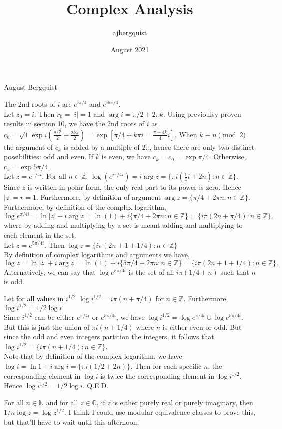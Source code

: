 \documentclass{article}
\title{Complex Analysis}
\author{ajbergquist }
\date{August 2021}
\theoremstyle{definition}
\newcommand{\Z}{\mathbb{Z}}
\newcommand{\C}{\mathbb{C}}
\newcommand{\N}{\mathbb{N}}
\newcommand{\cs}[1]{\color{blue}{#1}\normalcolor}
\begin{document}
\hfill August Bergquist

 The $2$nd roots of $i$ are $e^{i\pi/4}$ and $e^{i5\pi/4}$.\\

 Let $z_0 = i$. Then $r_0 = |i| =1$ and $\arg i = \pi/2 + 2\pi k$. Using previoulsy proven results in section 10, we have the 2nd roots of $i$ as
$c_k = \sqrt{1}\exp{i(\frac{\pi/2}{2} + \frac{2k\pi}{2}) = \exp{[\pi/4 + k\pi i= \frac{\pi + 4k}{4}i] }}$. When $k\equiv n \pmod{2}$ \cs{What is $n$?} the argument of $c_k$ is added by a multiple of $2\pi$, hence there are only two distinct possibilities: odd and even. If $k$ is even, we have $c_k = c_0 = \exp{\pi/4}$. Otherwise, $c_1 = \exp{5\pi/4}$.\\

 Let $z = e^{\pi/4i}$. For all $n\in \Z$, $\log(e^{i\pi/4i}) = i\arg{z} = \{\pi i(\frac{1}{4}i + 2n) : n\in \Z\}$. \\
 Since $z$ is written in polar form, the only real part to its power is zero. Hence $|z| = r= 1$. Furthermore, by definition of argument $\arg{z} = \{\pi/4 + 2\pi n : n\in \Z\}$. Furthermore, by definition of the complex logarithm, 
$$\log e^{\pi/4 i} =  \ln|z| + i\arg{z} = \ln(1) + i\{\pi/4 + 2\pi n: n\in \Z\} = \{i\pi(2n+\pi/4) : n\in \Z\},$$
where by adding and multiplying by a set is meant adding and multiplying to each element in the set.\\

 Let $z = e^{5\pi/4 i}$. Then $\log z = \{i\pi(2n+1+1/4) : n\in \Z\}$\\

By definition of complex logarithms and arguments we have,
$$\log z = \ln |z| + i\arg{z} = \ln(1) + i\{5\pi/4 + 2\pi n: n\in \Z\} = \{i\pi(2n + 1 + 1/4) : n\in \Z\}.$$ Alternatively, we can say that $\log{e^{5\pi/4i}}$ is the set of all $i\pi(1/4 + n)$ such that $n$ is odd. 

 Let for all values in $i^{1/2}$ $\log{i^{1/2}} = i\pi(n + \pi/4)$ for $n\in \Z$. Furthermore, $\log{i^{1/2}} = 1/2\log{i}$\\

 Since $i^{1/2}$ can be either $e^{\pi/4 i}$ or $e^{5\pi/4 i}$, we have $\log{i^{1/2}} = \log{e^{\pi/4i}}\cup \log{e^{5\pi/4i}}$. But this is just the union of $\pi i(n + 1/4)$ where $n$ is either even or odd. But since the odd and even integers partition the integers, it follows that $\log{i^{1/2}} = \{i\pi(n + 1/4): n\in \Z\}$. \cs{Great!} \\ 
Note that by definition of the complex logarithm, we have $\log{i} = \ln 1 + i\arg{i} = \{\pi i(1/2 + 2n)\}.$ Then for each specific $n$, the corresponding element in $\log{i}$ is twice the corresponding element in $\log{i^{1/2}}$. Hence $\log{i^{1/2}} = 1/2\log{i}$. Q.E.D.\\

\cs{10/10}

 For all $n\in \N$ and for all $z\in \C$, if $z$ is either purely real or purely imaginary, then $1/n\log{z} = \log{z^{1/2}}$. \cs{Is that a $z^{1/n}$?} I think I could use modular equivalence classes to prove this, but that'll have to wait until this afternoon.
\end{document}
